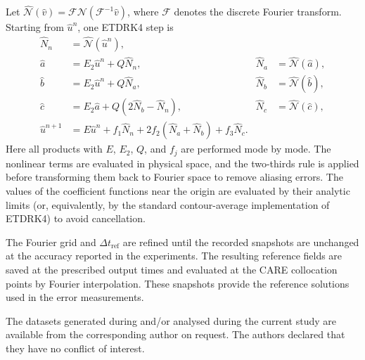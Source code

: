 \documentclass[10pt,reqno]{amsart}
\theoremstyle{remark}
\theoremstyle{definition}
\begin{document}
Let $\widehat{\mathcal N}(\widehat v)=
\mathcal F\mathcal N(\mathcal F^{-1}\widehat v)$, where $\mathcal F$
denotes the discrete Fourier transform. Starting from $\widehat u^n$, one
ETDRK4 step is
\begin{equation}
  \begin{aligned}
    \widehat N_n&=\widehat{\mathcal N}(\widehat u^n),\\
    \widehat a&=E_2\widehat u^n+Q\widehat N_n,
    &\widehat N_a&=\widehat{\mathcal N}(\widehat a),\\
    \widehat b&=E_2\widehat u^n+Q\widehat N_a,
    &\widehat N_b&=\widehat{\mathcal N}(\widehat b),\\
    \widehat c&=E_2\widehat a+Q(2\widehat N_b-\widehat N_n),
    &\widehat N_c&=\widehat{\mathcal N}(\widehat c),\\
    \widehat u^{n+1}&=E\widehat u^n+f_1\widehat N_n
    +2f_2(\widehat N_a+\widehat N_b)+f_3\widehat N_c.
  \end{aligned}
  \label{eq:SM ETDRK4 update}
\end{equation}
Here all products with $E$, $E_2$, $Q$, and $f_j$ are performed
mode by mode. The nonlinear terms are evaluated in physical space, and the
two-thirds rule is applied before transforming them back to Fourier space to
remove aliasing errors. The values of the coefficient functions near the
origin are evaluated by their analytic limits (or, equivalently, by the
standard contour-average implementation of ETDRK4) to avoid cancellation.

The Fourier grid and $\Delta t_{\mathrm{ref}}$ are refined until the recorded
snapshots are unchanged at the accuracy reported in the experiments. The
resulting reference fields are saved at the prescribed output times and
evaluated at the CARE collocation points by Fourier interpolation. These
snapshots provide the reference solutions used in the error measurements.


\vskip 0.1in

 The datasets generated during and/or analysed during the current study are available from the corresponding author on request.
\vskip 0.1in
 The authors declared that they have no conflict of interest.

\nocite{*}

\end{document}
